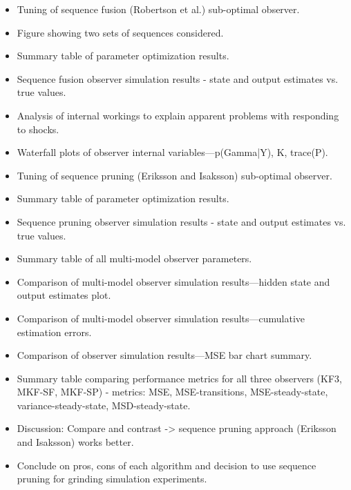 \begin{itemize}
	\item Tuning of sequence fusion (Robertson et al.) sub-optimal observer.
	\item Figure showing two sets of sequences considered.
	\item Summary table of parameter optimization results.
	\item Sequence fusion observer simulation results - state and output estimates vs. true values.
	\item Analysis of internal workings to explain apparent problems with responding to shocks.
	\item Waterfall plots of observer internal variables—p(Gamma|Y), K, trace(P).
	\item Tuning of sequence pruning (Eriksson and Isaksson) sub-optimal observer.
	\item Summary table of parameter optimization results.
	\item Sequence pruning observer simulation results - state and output estimates vs. true values.
	\item Summary table of all multi-model observer parameters.
	\item Comparison of multi-model observer simulation results—hidden state and output estimates plot.
	\item Comparison of multi-model observer simulation results—cumulative estimation errors.
	\item Comparison of observer simulation results—MSE bar chart summary.
	\item Summary table comparing performance metrics for all three observers (KF3, MKF-SF, MKF-SP) - metrics: MSE, MSE-transitions, MSE-steady-state, variance-steady-state, MSD-steady-state.
	\item Discussion: Compare and contrast -> sequence pruning approach (Eriksson and Isaksson) works better.
	\item Conclude on pros, cons of each algorithm and decision to use sequence pruning for grinding simulation experiments.
\end{itemize}

